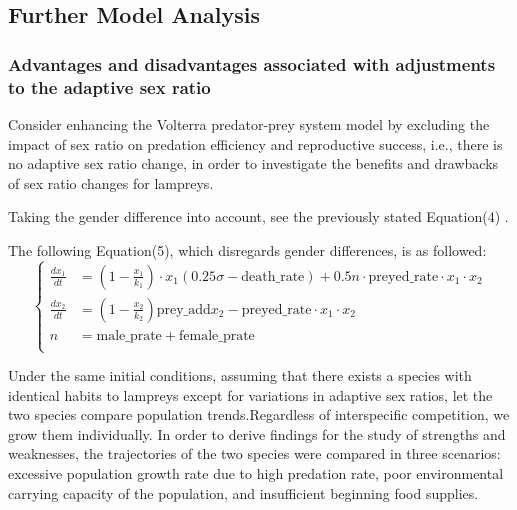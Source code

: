 \documentclass[12pt]{article}  %
\begin{document}
\subsection{Further Model Analysis} %
\subsubsection{%
Advantages and disadvantages associated with adjustments to the adaptive sex ratio}
Consider enhancing the Volterra predator-prey system model by excluding the impact of sex ratio on predation efficiency and reproductive success, i.e., there is no adaptive sex ratio change, in order to investigate the benefits and drawbacks of sex ratio changes for lampreys. \par
Taking the gender difference into account, see the previously stated Equation(4) .\par
The following Equation(5), which disregards gender differences, is as followed:
\begin{equation}
	\left\{
		\begin{aligned}
			\frac{dx_1}{dt} &= \left(1 - \frac{x_1}{k_1}\right) \cdot x_1 \left(0.25 \sigma - \text{death\_rate}\right) + 0.5 n  \cdot \text{preyed\_rate} \cdot x_1 \cdot x_2 \\
			\frac{dx_2}{dt} &= \left(1 - \frac{x_2}{k_2}\right) \text{prey\_add} x_2 - \text{preyed\_rate}\cdot x_1 \cdot x_2 \\
			n &= \text{male\_prate} + \text{female\_prate} \\
		\end{aligned}
		\right.
	\end{equation}
\par
Under the same initial conditions, assuming that there exists a species with identical habits to lampreys except for variations in adaptive sex ratios, let the two species compare population trends.Regardless of interspecific competition, we grow them individually. In order to derive findings for the study of strengths and weaknesses, the trajectories of the two species were compared in three scenarios: excessive population growth rate due to high predation rate, poor environmental carrying capacity of the population, and insufficient beginning food supplies.\par
\end{document}
